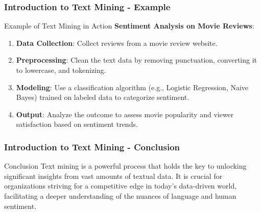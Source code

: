 \documentclass[aspectratio=169]{beamer}
\begin{document}
\begin{frame}[fragile]
    \frametitle{Introduction to Text Mining - Example}
    \begin{block}{Example of Text Mining in Action}
        \textbf{Sentiment Analysis on Movie Reviews}:
        
        \begin{enumerate}
            \item \textbf{Data Collection}: Collect reviews from a movie review website.
            \item \textbf{Preprocessing}: Clean the text data by removing punctuation, converting it to lowercase, and tokenizing.
            \item \textbf{Modeling}: Use a classification algorithm (e.g., Logistic Regression, Naive Bayes) trained on labeled data to categorize sentiment.
            \item \textbf{Output}: Analyze the outcome to assess movie popularity and viewer satisfaction based on sentiment trends.
        \end{enumerate}
    \end{block}
\end{frame}

\begin{frame}[fragile]
    \frametitle{Introduction to Text Mining - Conclusion}
    \begin{block}{Conclusion}
        Text mining is a powerful process that holds the key to unlocking significant insights from vast amounts of textual data. It is crucial for organizations striving for a competitive edge in today's data-driven world, facilitating a deeper understanding of the nuances of language and human sentiment.
    \end{block}
\end{frame}
\end{document}
